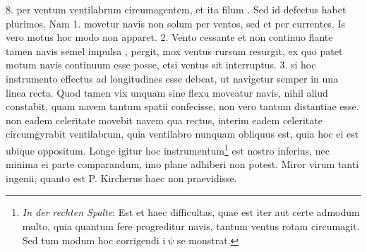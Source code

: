 8. per ventum ventilabrum circumagentem, et ita filum . Sed id defectus habet plurimos. Nam 1. movetur navis\protect{} non solum per ventos, sed et per currentes. Is vero motus hoc modo non apparet. 2. Vento cessante et non continuo flante tamen navis\protect{} semel impulsa , pergit, mox ventus rursum resurgit, ex quo patet motum navis\protect{} continuum esse posse, etsi ventus sit interruptus. 3.  si hoc instrumento effectus ad longitudines\protect{} esse debeat, ut navigetur semper in una linea recta. Quod tamen vix unquam sine flexu moveatur navis, nihil aliud constabit, quam navem\protect{} tantum spatii confecisse, non vero tantum distantiae esse.  non eadem
 celeritate\protect{} movebit navem qua rectus, interim eadem celeritate\protect{} circumgyrabit ventilabrum, quia ventilabro nunquam obliquus est, quia hoc ei est ubique  oppositum. Longe igitur hoc instrumentum\footnote{\textit{In der rechten Spalte}: Est et haec difficultas, quae  est iter aut certe admodum multo, quia quantum fere progreditur  navis\protect{}, tantum ventus rotam\protect{} circumagit. 
  Sed tum modum hoc corrigendi i$\uppsi$se monstrat.} 
 est nostro inferius, nec minima ei parte comparandum, imo plane adhiberi non potest. Miror virum tanti ingenii, quanto est P. Kircherus\protect{} haec non praevidisse.

